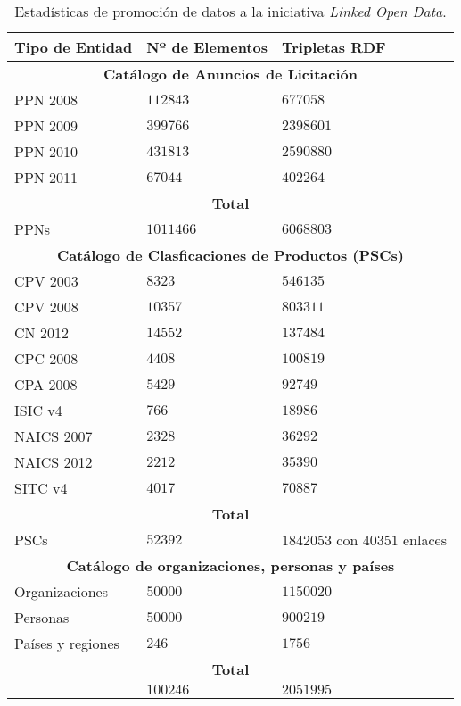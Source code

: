 \documentclass[a4paper,final,11pt,fleqn,twoside]{book}  %
\begin{document}
\begin{table}[!t]
  \centering
  \caption{Estadísticas de promoción de datos a la iniciativa \textit{Linked Open Data}.}\label{resultado}   
    \begin{tabular}{|p{2.5cm}|p{1.8cm}|p{3.5cm}|} 
    \hline
    \textbf{Tipo de Entidad} & \textbf{Nº de Elementos}  &  \textbf{Tripletas RDF}  \\\hline
     \multicolumn{3}{|c|}{\textbf{Catálogo de Anuncios de Licitación}} \\ \hline     
	PPN 2008 & $112843$  &   $677058$  \\ \hline
	PPN 2009 & $399766$ &   $2398601$   \\ \hline
	PPN 2010  & $431813$&  $2590880$  \\ \hline
        PPN 2011 & $67044$&   $402264$   \\ \hline
        \multicolumn{3}{|c|}{\textbf{Total}} \\ \hline
        PPNs & $1011466$ &  $6068803$   \\ \hline     
        \multicolumn{3}{|c|}{\textbf{Catálogo de Clasficaciones de Productos (PSCs)}} \\ \hline
        CPV 2003 & $8323$  & $546135$  \\ \hline
        CPV 2008 & $10357$ &  $803311$ \\ \hline
        CN 2012  & $14552$&  $137484$ \\ \hline
        CPC 2008 & $4408$&   $100819$\\ \hline
        CPA 2008 & $5429$&  $92749$ \\ \hline
        ISIC v4  & $766$&  $18986$  \\ \hline
        NAICS 2007 & $2328$&  $36292$   \\ \hline
      NAICS 2012 & $2212$&  $35390$    \\ \hline
      SITC v4 & $4017$&  $70887$    \\ \hline
      \multicolumn{3}{|c|}{\textbf{Total}} \\ \hline
      PSCs & $52392$ &   $1842053$  con $40351$ enlaces  \\ \hline
       \multicolumn{3}{|c|}{\textbf{Catálogo de organizaciones, personas y países}} \\ \hline
      Organizaciones & $50000$   & $1150020$   \\ \hline
      Personas & $50000$    & $900219$  \\ \hline
      Países y regiones & $246$     & $1756$  \\ \hline
           \multicolumn{3}{|c|}{\textbf{Total}} \\ \hline
       & $100246$  & $2051995$   \\ \hline
      \end{tabular}
 \end{table}   
 
\end{document}
